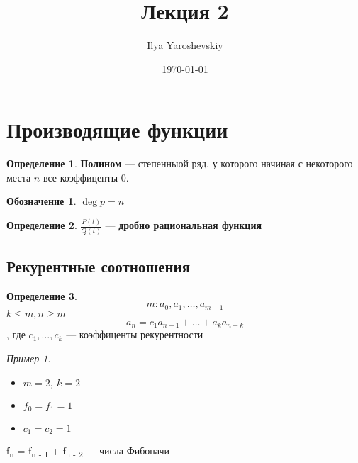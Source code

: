 \documentclass[english]{article}
\author{Ilya Yaroshevskiy}
\date{\today}
\title{Лекция 2}
\theoremstyle{plain}
\theoremstyle{remark}
\newtheorem*{examp}{Пример}
\theoremstyle{definition}
\newtheorem*{definition}{Определение}
\newtheorem*{symb}{Обозначение}
\begin{document}
\maketitle
\tableofcontents


\section{Производящие функции}
\label{sec:org5823255}
\begin{definition}
\textbf{Полином} --- степенныой ряд, у которого начиная с некоторого места
 \(n\) все коэффиценты 0.
\end{definition}
\begin{symb}
\(\deg p = n\)
\end{symb}
\begin{definition}
\(\frac{P(t)}{Q(t)}\) --- \textbf{дробно рациональная функция}
\end{definition}
\subsection{Рекурентные соотношения}
\label{sec:org15f1a67}
\begin{definition}
\[ m: a_0, a_1, \dots, a_{m - 1} \]
\(k \le m, n \ge m\) \[ a_n = c_1a_{n-1} + \dots + a_ka_{n - k} \], где \(c_1, \dots, c_k\) --- коэффиценты рекурентности
\end{definition}
\begin{examp}
\-
\begin{itemize}
\item \(m = 2,\ k = 2\)
\item \(f_0 = f_1 = 1\)
\item \(c_1 = c_2 = 1\)
\end{itemize}
f\textsubscript{n} = f\textsubscript{n - 1} + f\textsubscript{n - 2} --- числа Фибоначи
\end{examp}
\end{document}
